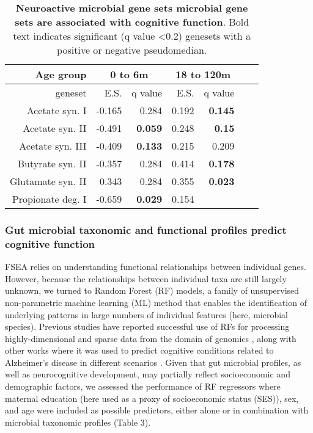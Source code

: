 \documentclass{article}
\providecommand{\DIFadd}[1]{{\protect\color{blue}\uwave{#1}}} %
\providecommand{\DIFaddbegin}{} %
\providecommand{\DIFaddend}{} %
\newcommand{\DIFaddincludegraphics}[2][]{{\color{blue}\fbox{\DIFOincludegraphics[#1]{#2}}}} %
\DeclareRobustCommand{\DIFaddbegin}{\DIFOaddbegin \let\includegraphics\DIFaddincludegraphics} %
\DeclareRobustCommand{\DIFaddend}{\DIFOaddend \let\includegraphics\DIFOincludegraphics} %
\begin{document}
\begin{table}[!h]
    \begin{center}
    \begin{tabular}{|r|r|r|r|r|r|r|}
        \hline
        \textbf{Age group}& \multicolumn{2}{c|}{\textbf{0 to 6m}} & \multicolumn{2}{c|}{\textbf{18 to 120m}} \\\hline
        geneset & E.S. & q value & E.S. & q value \\\hline
        Acetate syn. I & -0.165 & 0.284 & 0.192 & \textbf{0.145} \\
        Acetate syn. II & -0.491 & \textbf{0.059} & 0.248 & \textbf{0.15} \\
        Acetate syn. III & -0.409 & \textbf{0.133} & 0.215 & 0.209 \\
        Butyrate syn. II & -0.357 & 0.284 & 0.414 & \textbf{0.178} \\
        Glutamate syn. II & 0.343 & 0.284 & 0.355 & \textbf{0.023} \\
        Propionate deg. I & -0.659 & \textbf{0.029} & 0.154 & \color{red}{\textbf{0.178}} \\\hline
    \end{tabular}
    \caption{\label{tab:fsea} \textbf{Neuroactive microbial gene sets microbial gene sets are associated with cognitive function}.
    Bold text indicates significant (q value \textless 0.2) genesets with a positive or negative
    pseudomedian.}
    \end{center}
\end{table}
 

\subsubsection*{Gut microbial taxonomic and functional profiles predict \DIFaddbegin \DIFadd{concurrently measured }\DIFaddend cognitive function}

FSEA relies on understanding functional relationships between individual
genes. However, because the relationships between individual taxa are
still largely unknown, we turned to Random Forest (RF) models, a family of 
unsupervised non-parametric machine learning (ML) method that enables
the identification of underlying patterns in large numbers of individual features
(here, microbial species).
Previous studies have reported
successful use of RFs for processing highly-dimensional and sparse data
from the domain of genomics
\cite{amaratungaEnrichedRandomForests2008,brieucPracticalIntroductionRandom2018,chenRandomForestsGenomic2012,franzosaGutMicrobiomeStructure2019,stephanRandomForestApproach2015},
along with other works where it was used
to predict cognitive conditions related to Alzheimer's disease in
different scenarios \cite{ardekaniPredictionIncipientAlzheimer2017,velazquezRandomForestModel2021}.
Given that gut microbial profiles, as well as neurocognitive
development, may partially reflect socioeconomic and demographic
factors, we assessed the performance of RF regressors where maternal
education (here used as a proxy of socioeconomic status (SES)),
sex, and age were included as possible predictors, either alone
or in combination with microbial taxonomic profiles (Table 3).
\end{document}

